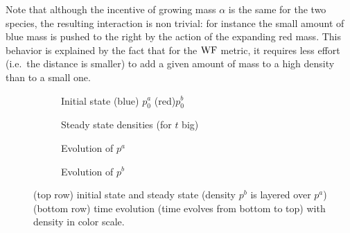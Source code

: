 Note that although the incentive of growing mass $\alpha$ is the same for the two species, the resulting interaction is non trivial: for instance the small amount of blue mass is pushed to the right by the action of the expanding red mass. This behavior is explained by the fact that for the $\operatorname{WF}$ metric, it requires less effort (i.e.\ the distance is smaller) to add a given amount of mass to a high density than to a small one.
\begin{figure}
\begin{subfigure}{.49\linewidth}
\centering
\caption{Initial state (blue) $p_0^a$ (red)$p_0^b$}\label{fig_GFWF2_input}
\end{subfigure}
 \begin{subfigure}{.49\linewidth}
\centering
\caption{Steady state densities (for $t$ big)}
\end{subfigure}
\begin{subfigure}{.49\linewidth}
\centering
\caption{Evolution of $p^a$}
\end{subfigure}
 \begin{subfigure}{.49\linewidth}
\centering
\caption{Evolution of $p^b$}
\end{subfigure}
\caption{(top row) initial state and steady state (density $p^b$ is layered over $p^a$) (bottom row) time evolution (time evolves from bottom to top) with density in color scale.}
\label{fig_WFGF2}
\end{figure}

